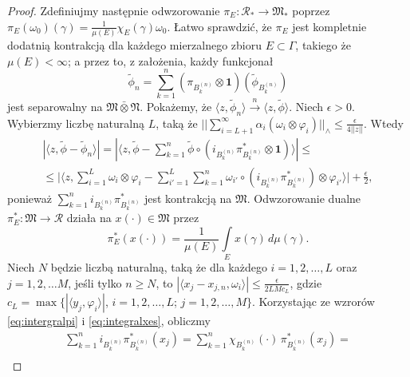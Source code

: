 \begin{proof}
Zdefiniujmy następnie odwzorowanie
$\pi_{E}: \mathcal{R}_{*} \rightarrow \mathfrak{M}_{*}$
poprzez $\pi_{E}(\omega_{0})(\gamma) =\frac{1}{\mu(E)} \chi_{E}(\gamma)\omega_{0}$.
Łatwo sprawdzić, że $\pi_{E}$ jest kompletnie dodatnią kontrakcją dla każdego
mierzalnego zbioru $E \subset \Gamma$, takiego że $\mu(E) < \infty$;
a przez to, z założenia, każdy funkcjonał
\begin{equation}
\tilde{\phi}_{n} = \sum \limits_{k=1}^{n}
(\pi_{B_{k}^{(n)}} \otimes \mathbf{1})
( \tilde{\phi}_{B_{k}^{(n)}} )
\end{equation}
jest separowalny na $\mathfrak{M} \bar{\otimes} \mathfrak{N}$.
Pokażemy, że $\langle z , \tilde{\phi}_{n} \rangle
\stackrel{n}{\rightarrow}\langle z , \tilde{\phi} \rangle$.
Niech $\epsilon > 0$.
Wybierzmy liczbę naturalną $L$, taką że
$|| \sum_{i=L+1}^{\infty}\alpha_i(\omega_{i} \otimes \varphi_{i}) ||_{\wedge}
\leq \frac{\epsilon}{4 ||z||}$.
Wtedy
\begin{eqnarray}
\label{eq:Ineq}
|\langle z, \tilde{\phi} - \tilde{\phi}_{n} \rangle| =
|\langle z, \tilde{\phi} -\sum \limits_{k=1}^{n} \tilde{\phi}
\circ (i_{B_{k}^{(n)}} \pi^{*}_{B_{k}^{(n)}} \otimes \mathbf{1})
\rangle | \leq \nonumber\\
\leq \Big |\langle z,\sum \limits_{i=1}^{L} \omega_{i} \otimes \varphi_{i} -
\sum \limits_{i'=1}^{L}\sum \limits_{k=1}^{n}
\omega_{i'} \circ (i_{B_{k}^{(n)}} \pi^{*}_{B_{k}^{(n)}})
\otimes \varphi_{i'}
\rangle \Big | + \frac{\epsilon}{2},
\end{eqnarray}
ponieważ $\sum_{k=1}^{n} i_{B_{k}^{(n)}} \pi^{*}_{B_{k}^{(n)}}$
jest kontrakcją na $\mathfrak{M}$.
Odwzorowanie dualne
$\pi^{*}_{E}: \mathfrak{M} \rightarrow \mathcal{R}$
działa na $x(\cdot) \in \mathfrak{M}$ przez
\begin{equation}
\label{eq:intergralpi}
\pi^{*}_{E}(x(\cdot)) = \frac{1}{\mu(E)}
\int \limits_{E} x(\gamma) \, d\mu(\gamma).
\end{equation}
Niech $N$ będzie liczbą naturalną, taką że dla każdego $i = 1, 2, \ldots, L$
oraz $j = 1,2, \ldots M$, jeśli tylko $n \geq N$,
to $|\langle x_{j} - x_{j,n}, \omega_{i} \rangle| \leq
\frac{\epsilon}{2 L M c_{L} }$, gdzie
$c_{L} = \max \{ |\langle y_{j}, \varphi_{i} \rangle |$,
$i = 1,2, \ldots, L$; $j = 1,2, \ldots, M \}$.
Korzystając ze wzrorów \eqref{eq:intergralpi} i \eqref{eq:integralxes},
obliczmy
\begin{eqnarray}
\sum \limits_{k=1}^{n} i_{B_{k}^{(n)}} \pi^{*}_{B_{k}^{(n)}} (x_{j})
=\sum \limits_{k=1}^{n} \chi_{B_{k}^{(n)}}(\cdot) \,
\pi^{*}_{B_{k}^{(n)}} (x_{j}) = \nonumber\\

\end{eqnarray}
\end{proof}
